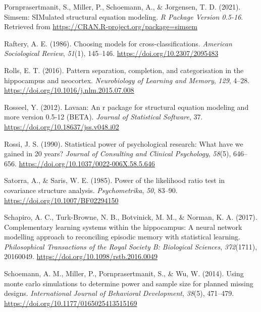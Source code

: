 \documentclass[
  man,floatsintext]{apa6}
\newlength{\cslhangindent}
\newlength{\cslentryspacingunit} %
\newenvironment{CSLReferences}[2] %
 {%
  \setlength{\parindent}{0pt}
  \ifodd #1
  \let\oldpar\par
  \def\par{\hangindent=\cslhangindent\oldpar}
  \fi
  \setlength{\parskip}{#2\cslentryspacingunit}
 }%
 {}
\begin{document}
\begin{CSLReferences}{1}{0}
\leavevmode{}%
Pornprasertmanit, S., Miller, P., Schoemann, A., \& Jorgensen, T. D. (2021). Simsem: {SIMulated} structural equation modeling. \emph{R Package Version 0.5-16}. Retrieved from \url{https://CRAN.R-project.org/package=simsem}

\leavevmode{}%
Raftery, A. E. (1986). Choosing models for cross-classifications. \emph{American Sociological Review}, \emph{51}(1), 145--146. \url{https://doi.org/10.2307/2095483}

\leavevmode{}%
Rolls, E. T. (2016). Pattern separation, completion, and categorisation in the hippocampus and neocortex. \emph{Neurobiology of Learning and Memory}, \emph{129}, 4--28. \url{https://doi.org/10.1016/j.nlm.2015.07.008}

\leavevmode{}%
Rosseel, Y. (2012). Lavaan: An r package for structural equation modeling and more version 0.5-12 ({BETA}). \emph{Journal of Statistical Software}, 37. \url{https://doi.org/10.18637/jss.v048.i02}

\leavevmode{}%
Rossi, J. S. (1990). Statistical power of psychological research: What have we gained in 20 years? \emph{Journal of Consulting and Clinical Psychology}, \emph{58}(5), 646--656. \url{https://doi.org/10.1037/0022-006X.58.5.646}

\leavevmode{}%
Satorra, A., \& Saris, W. E. (1985). Power of the likelihood ratio test in covariance structure analysis. \emph{Psychometrika}, \emph{50}, 83--90. \url{https://doi.org/10.1007/BF02294150}

\leavevmode{}%
Schapiro, A. C., Turk-Browne, N. B., Botvinick, M. M., \& Norman, K. A. (2017). Complementary learning systems within the hippocampus: A neural network modelling approach to reconciling episodic memory with statistical learning. \emph{Philosophical Transactions of the Royal Society B: Biological Sciences}, \emph{372}(1711), 20160049. \url{https://doi.org/10.1098/rstb.2016.0049}

\leavevmode{}%
Schoemann, A. M., Miller, P., Pornprasertmanit, S., \& Wu, W. (2014). Using monte carlo simulations to determine power and sample size for planned missing designs. \emph{International Journal of Behavioral Development}, \emph{38}(5), 471--479. \url{https://doi.org/10.1177/0165025413515169}


\end{CSLReferences}
\end{document}
